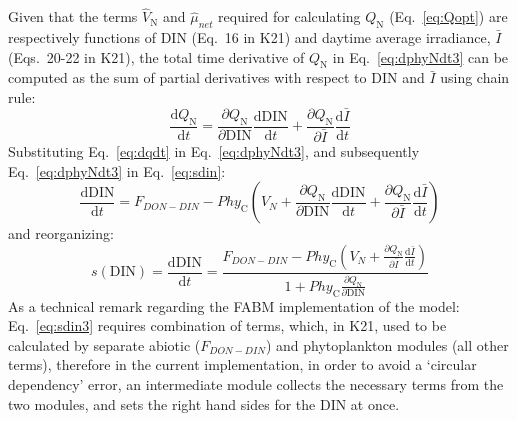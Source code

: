 \documentclass[gmd, manuscript]{copernicus}
\begin{document}
Given that the terms $\hat{V}_{\text{N}}$ and $\hat{\mu}_{net}$ required for calculating $Q_{\text{N}}$ (Eq.~\ref{eq:Qopt}) are respectively functions of DIN (Eq.~16 in K21) and daytime average irradiance, $\bar{I}$ (Eqs.~20-22 in K21), the total time derivative of $Q_{\text{N}}$ in Eq.~\ref{eq:dphyNdt3} can be computed as the sum of partial derivatives with respect to DIN and $\bar{I}$ using chain rule: 
\begin{equation} \label{eq:dqdt}
 \frac{\text{d} Q_{\text{N}}}{\text{d} t} = \frac{\partial Q_{\text{N}}}{\partial \text{DIN}} \frac{\text{d} \text{DIN}}{\text{d} t} +  \frac{\partial Q_{\text{N}}}{\partial \bar{I}} \frac{\text{d} \bar{I}}{\text{d} t} 
\end{equation}
Substituting Eq.~\ref{eq:dqdt} in Eq.~\ref{eq:dphyNdt3}, and subsequently Eq.~\ref{eq:dphyNdt3} in Eq.~\ref{eq:sdin}:
\begin{equation}\label{eq:sdin2}
 \frac{\text{d}\text{DIN}}{\text{d}t} = F_{DON-DIN} - Phy_{\text{C}} \left(V_N + \frac{\partial Q_{\text{N}}}{\partial \text{DIN}} \frac{\text{d} \text{DIN}}{\text{d} t} +  \frac{\partial Q_{\text{N}}}{\partial \bar{I}} \frac{\text{d} \bar{I}}{\text{d} t} \right)
\end{equation}
and reorganizing:
\begin{equation}\label{eq:sdin3}
 s(\text{DIN}) = \frac{\text{d}\text{DIN}}{\text{d}t} = \frac{F_{DON-DIN} - Phy_{\text{C}} \left(V_N +  \frac{\partial Q_{\text{N}}}{\partial \bar{I}} \frac{\text{d} \bar{I}}{\text{d} t} \right)}{ 1+Phy_{\text{C}}\frac{\partial Q_{\text{N}}}{\partial \text{DIN}}}
\end{equation}
As a technical remark regarding the FABM implementation of the model: Eq.~\ref{eq:sdin3} requires combination of terms, which, in K21, used to be calculated by separate abiotic ($F_{DON-DIN}$) and phytoplankton modules (all other terms), therefore in the current implementation, in order to avoid a `circular dependency' error, an intermediate module collects the necessary terms from the two modules, and sets the right hand sides for the DIN at once.
\end{document}
